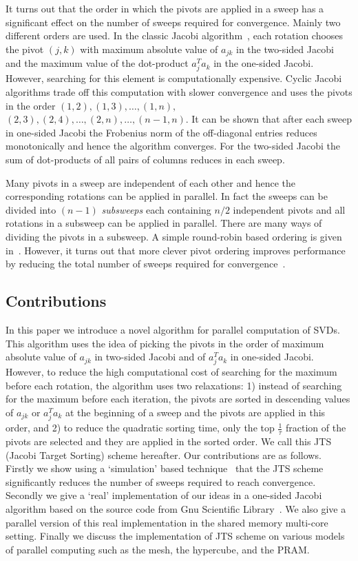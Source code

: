 \documentclass[10pt, conference, compsocconf]{IEEEtran}
\begin{document}
It turns out that the order in which the pivots are applied in a sweep has a significant effect on the number of sweeps required for convergence. Mainly two different orders are used. In the classic Jacobi algorithm~\cite{golub2012matrix}, each rotation chooses the pivot $(j,k)$ with maximum absolute value of $a_{jk}$ in the two-sided Jacobi and the maximum value of the dot-product $a_j^{T}a_k$ in the one-sided Jacobi. However, searching for this element is computationally expensive. Cyclic Jacobi algorithms trade off this computation with slower convergence and uses the pivots in the order $(1,2), (1,3), \ldots, (1,n),$ $(2,3), (2,4), \ldots, (2,n), \ldots, (n{-}1,n)$.  It can be shown that after each sweep in one-sided Jacobi the Frobenius norm of the off-diagonal entries reduces monotonically and hence the algorithm converges. For the two-sided Jacobi the sum of dot-products of all pairs of columns reduces in each sweep.

Many pivots in a sweep are independent of each other and hence the corresponding rotations can be applied in parallel. In fact the sweeps can be divided into $(n-1)$ \emph{subsweeps} each containing $n/2$ independent pivots and all rotations in a subsweep can be applied in parallel. There are many ways of dividing the pivots in a subsweep. A simple round-robin based ordering is given in~\cite{golub2012matrix}. However, it turns out that more clever pivot ordering improves performance by reducing the total number of sweeps required for convergence~\cite{bevcka2002dynamic}.

\subsection{Contributions}

In this paper we introduce a novel algorithm for parallel computation of SVDs. This algorithm uses the idea of picking the pivots in the order of maximum absolute value of $a_{jk}$ in two-sided Jacobi and of $a_j^T a_k$ in one-sided Jacobi. However, to reduce the high computational cost of searching for the maximum before each rotation, the algorithm uses two relaxations: 1) instead of searching for the maximum before each iteration, the pivots are sorted in descending values of $a_{jk}$ or $a_j^T a_k$ at the beginning of a sweep and the pivots are applied in this order, and 2) to reduce the quadratic sorting time, only the top $\frac{1}{\tau}$ fraction of the pivots are selected and they are applied in the sorted order. We call this JTS (Jacobi Target Sorting) scheme hereafter. Our contributions are as follows. Firstly we show using a `simulation' based technique~\cite{rajasekaran2008relaxation} that the JTS scheme significantly reduces the number of sweeps required to reach convergence. Secondly we give a `real' implementation of our ideas in a one-sided Jacobi algorithm based on the source code from Gnu Scientific Library~\cite{galassi1996gnu}. We also give a parallel version of this real implementation in the shared memory multi-core setting. Finally we discuss the implementation of JTS scheme on various models of parallel computing such as the mesh, the hypercube, and the PRAM.
 
\end{document}
